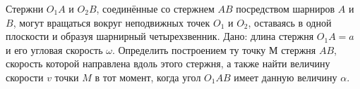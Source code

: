 Стержни $O_{1}A$ и $O_{2}B$, соединённые со стержнем $AB$ посредством шарниров $A$ и $B$, могут вращаться
вокруг неподвижных точек $O_{1}$ и $O_{2}$, оставаясь в одной плоскости и образуя шарнирный четырехзвенник.
Дано: длина стержня $O_{1}A=a$ и его угловая скорость $\omega$. Определить построением ту точку $М$ стержня
$AB$, скорость которой направлена вдоль этого стержня, а также найти величину скорости $v$ точки $M$ в тот момент,
когда угол $O_{1}AB$ имеет данную величину $\alpha$.
